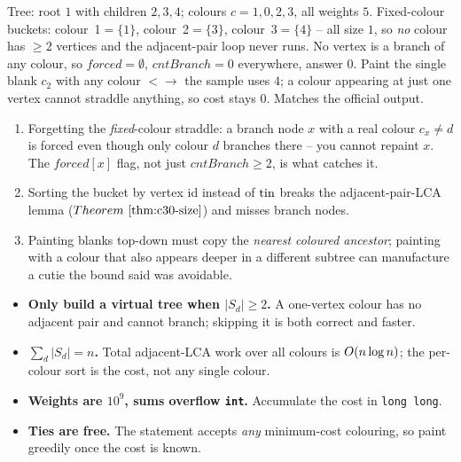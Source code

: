 \begin{tracebox}
Tree: root \(1\) with children \(2,3,4\); colours \(c=1,0,2,3\), all weights \(5\).
Fixed-colour buckets: colour~1\(=\{1\}\), colour~2\(=\{3\}\), colour~3\(=\{4\}\) -- all
size \(1\), so \emph{no} colour has \(\ge2\) vertices and the adjacent-pair loop never
runs.  No vertex is a branch of any colour, so \(\mathit{forced}=\emptyset\),
\(\mathit{cntBranch}=0\) everywhere, answer \(\boxed{0}\).  Paint the single blank
\(c_2\) with any colour \(<\!\!\to\) the sample uses \(4\); a colour appearing at just
one vertex cannot straddle anything, so cost stays \(0\).  Matches the official output.
\end{tracebox}

\begin{warningbox}
\begin{enumerate}[nosep,leftmargin=1.6em]
  \item Forgetting the \emph{fixed}-colour straddle: a branch node \(x\) with a real
        colour \(c_x\ne d\) is forced even though only colour \(d\) branches there --
        you cannot repaint \(x\).  The \(\mathit{forced}[x]\) flag, not just
        \(\mathit{cntBranch}\ge2\), is what catches it.
  \item Sorting the bucket by vertex id instead of \(\operatorname{tin}\) breaks the
        adjacent-pair-LCA lemma (\(\thmref{c30-size}\)) and misses branch nodes.
  \item Painting blanks top-down must copy the \emph{nearest coloured ancestor};
        painting with a colour that also appears deeper in a different subtree can
        manufacture a cutie the bound said was avoidable.
\end{enumerate}
\end{warningbox}

\begin{hardeningbox}
\begin{itemize}[nosep,leftmargin=1.4em]
  \item \textbf{Only build a virtual tree when \(|S_d|\ge2\).} A one-vertex colour has
        no adjacent pair and cannot branch; skipping it is both correct and faster.
  \item \textbf{\(\sum_d|S_d|=n\).} Total adjacent-LCA work over all colours is
        \(O(n\log n)\); the per-colour sort is the cost, not any single colour.
  \item \textbf{Weights are \(10^9\), sums overflow \texttt{int}.} Accumulate the cost
        in \texttt{long long}.
  \item \textbf{Ties are free.} The statement accepts \emph{any} minimum-cost
        colouring, so paint greedily once the cost is known.
\end{itemize}
\end{hardeningbox}

